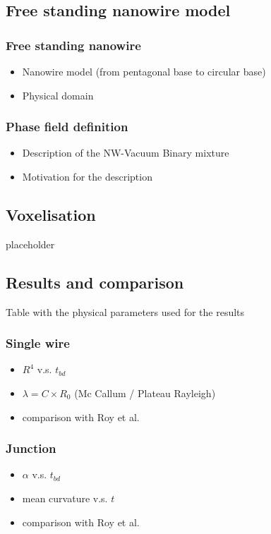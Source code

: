 \subsection{Free standing nanowire model}
    \subsubsection{Free standing nanowire}
    \begin{itemize}
        \item Nanowire model (from pentagonal base to circular base)
        \item Physical domain
    \end{itemize}
    \subsubsection{Phase field definition}
    \begin{itemize}
        \item Description of the NW-Vacuum Binary mixture
        \item Motivation for the description
    \end{itemize}
\subsection{Voxelisation}
    placeholder
\subsection{Results and comparison}
    Table with the physical parameters used for the results
    \subsubsection{Single wire}
    \begin{itemize}
        \item $R^4$ v.s. $t_{bd}$
        \item $\lambda = C \times R_0$ (Mc Callum / Plateau Rayleigh)
        \item comparison with Roy et al.
    \end{itemize}
    \subsubsection{Junction}
    \begin{itemize}
        \item $\alpha$ v.s. $t_{bd}$
        \item mean curvature v.s. $t$
        \item comparison with Roy et al.
    \end{itemize}

